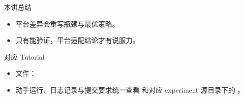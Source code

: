 \begin{frame}{本讲总结}
  \begin{itemize}
    \item 平台差异会重写瓶颈与最优策略。
    \item 只有能验证，平台适配结论才有说服力。
  \end{itemize}
\end{frame}

\LectureNineSources

\begin{frame}{对应 Tutorial}
  \begin{itemize}
    \item 文件：\texttt{}
    \item 动手运行、日志记录与提交要求统一查看 \texttt{} 和对应 experiment 源目录下的 \texttt{}。
  \end{itemize}
\end{frame}


